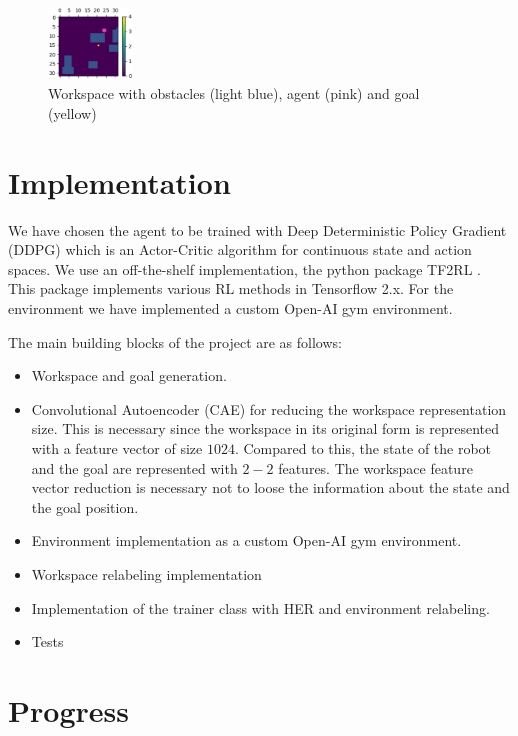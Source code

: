 \documentclass[conference]{IEEEtran}
\begin{document}
\begin{figure}[h!]
	\centering
	\includegraphics[width=0.2\textwidth]{fig/workspace.jpg}
	\caption{Workspace with obstacles (light blue), agent (pink) and goal (yellow)}
	\label{fig:1}
\end{figure}

\section{Implementation}

We have chosen the agent to be trained with Deep Deterministic Policy Gradient (DDPG) \cite{DDPG} which is an Actor-Critic algorithm for continuous state and action spaces. We use an off-the-shelf implementation, the python package TF2RL \cite{TF2RL}. This package implements various RL methods in Tensorflow 2.x. For the environment we have implemented a custom Open-AI gym environment.

The main building blocks of the project are as follows:
\begin{itemize}
	\item Workspace and goal generation.
	\item Convolutional Autoencoder (CAE) for reducing the workspace representation size. This is necessary since the workspace in its original form is represented with a feature vector of size $1024$. Compared to this, the state of the robot and the goal are represented with $2-2$ features. The workspace feature vector reduction is necessary not to loose the information about the state and the goal position.
	\item Environment implementation as a custom Open-AI gym environment.
	\item Workspace relabeling implementation
	\item Implementation of the trainer class with HER and environment relabeling.
	\item Tests
\end{itemize}

\section{Progress}
\end{document}
